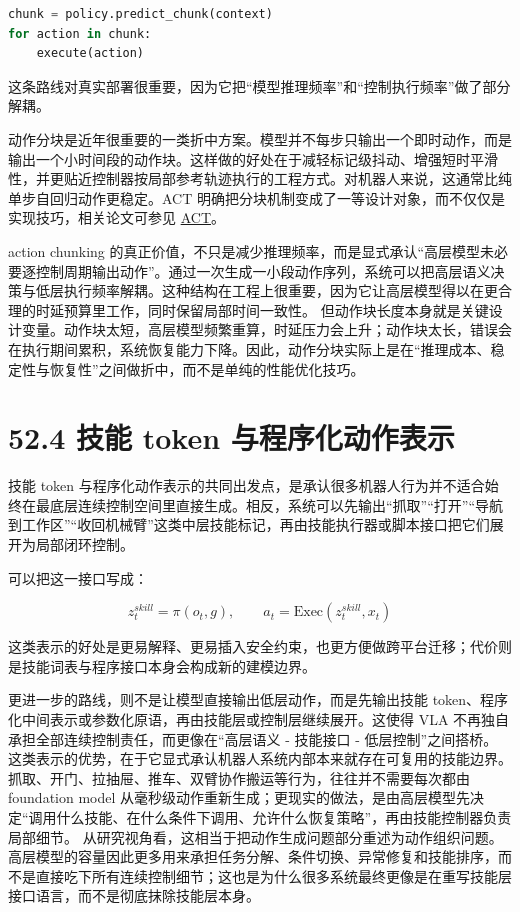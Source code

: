 \begin{lstlisting}[language=python]
chunk = policy.predict_chunk(context)
for action in chunk:
    execute(action)
\end{lstlisting}

这条路线对真实部署很重要，因为它把“模型推理频率”和“控制执行频率”做了部分解耦。

动作分块是近年很重要的一类折中方案。模型并不每步只输出一个即时动作，而是输出一个小时间段的动作块。这样做的好处在于减轻标记级抖动、增强短时平滑性，并更贴近控制器按局部参考轨迹执行的工程方式。对机器人来说，这通常比纯单步自回归动作更稳定。ACT 明确把分块机制变成了一等设计对象，而不仅仅是实现技巧，相关论文可参见 \href{https://arxiv.org/abs/2304.13705}{ACT}。

action chunking 的真正价值，不只是减少推理频率，而是显式承认“高层模型未必要逐控制周期输出动作”。通过一次生成一小段动作序列，系统可以把高层语义决策与低层执行频率解耦。这种结构在工程上很重要，因为它让高层模型得以在更合理的时延预算里工作，同时保留局部时间一致性。 但动作块长度本身就是关键设计变量。动作块太短，高层模型频繁重算，时延压力会上升；动作块太长，错误会在执行期间累积，系统恢复能力下降。因此，动作分块实际上是在“推理成本、稳定性与恢复性”之间做折中，而不是单纯的性能优化技巧。

\section*{52.4 技能 token 与程序化动作表示}


技能 token 与程序化动作表示的共同出发点，是承认很多机器人行为并不适合始终在最底层连续控制空间里直接生成。相反，系统可以先输出“抓取”“打开”“导航到工作区”“收回机械臂”这类中层技能标记，再由技能执行器或脚本接口把它们展开为局部闭环控制。

可以把这一接口写成：

\begingroup
\footnotesize
\begin{equation*}
z_t^{skill} = \pi(o_t, g), \qquad a_t = \mathrm{Exec}(z_t^{skill}, x_t)
\end{equation*}
\endgroup

这类表示的好处是更易解释、更易插入安全约束，也更方便做跨平台迁移；代价则是技能词表与程序接口本身会构成新的建模边界。

更进一步的路线，则不是让模型直接输出低层动作，而是先输出技能 token、程序化中间表示或参数化原语，再由技能层或控制层继续展开。这使得 VLA 不再独自承担全部连续控制责任，而更像在“高层语义 - 技能接口 - 低层控制”之间搭桥。 这类表示的优势，在于它显式承认机器人系统内部本来就存在可复用的技能边界。抓取、开门、拉抽屉、推车、双臂协作搬运等行为，往往并不需要每次都由 foundation model 从毫秒级动作重新生成；更现实的做法，是由高层模型先决定“调用什么技能、在什么条件下调用、允许什么恢复策略”，再由技能控制器负责局部细节。 从研究视角看，这相当于把动作生成问题部分重述为动作组织问题。高层模型的容量因此更多用来承担任务分解、条件切换、异常修复和技能排序，而不是直接吃下所有连续控制细节；这也是为什么很多系统最终更像是在重写技能层接口语言，而不是彻底抹除技能层本身。

